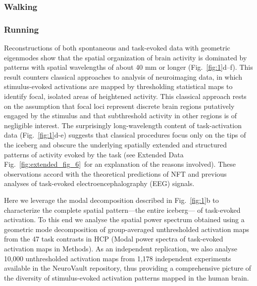 \documentclass[sn-mathphys-num]{sn-jnl}%
\theoremstyle{thmstyleone}%
\theoremstyle{thmstyletwo}%
\theoremstyle{thmstylethree}%
\begin{document}
\subsubsection{Walking}


\subsubsection{Running}

Reconstructions of both spontaneous and task-evoked data with geometric eigenmodes show that the spatial organization of brain activity is dominated by patterns with spatial wavelengths of about 40 mm or longer (Fig.~\ref{fig:1}d–f). 
This result counters classical approaches to analysis of neuroimaging data, in which stimulus-evoked activations are mapped by thresholding statistical maps to identify focal, isolated areas of heightened activity. 
This classical approach rests on the assumption that focal loci represent discrete brain regions putatively engaged by the stimulus and that subthreshold activity in other regions is of negligible interest. 
The surprisingly long-wavelength content of task-activation data (Fig.~\ref{fig:1}d-e) suggests that classical procedures focus only on the tips of the iceberg and obscure the underlying spatially extended and structured patterns of activity evoked by the task (see Extended Data Fig.~\ref{fig:extended_fig_6}~for an explanation of the reasons involved). 
These observations accord with the theoretical predictions of NFT and previous analyses of task-evoked electroencephalography (EEG) signals\cite{robinson2001modal,wingeier2001spherical}.


Here we leverage the modal decomposition described in Fig.~\ref{fig:1}b to characterize the complete spatial pattern—the entire iceberg— of task-evoked activation. 
To this end we analyse the spatial power spectrum obtained using a geometric mode decomposition of group-averaged unthresholded activation maps from the 47 task contrasts in HCP\cite{van2013wu,gorgolewski2015neurovault} (Modal power spectra of task-evoked activation maps in Methods). 
As an independent replication, we also analyse 10,000 unthresholded activation maps from 1,178 independent experiments available in the NeuroVault repository\cite{van2013wu,gorgolewski2015neurovault}, thus providing a comprehensive picture of the diversity of stimulus-evoked activation patterns mapped in the human brain.
\end{document}

